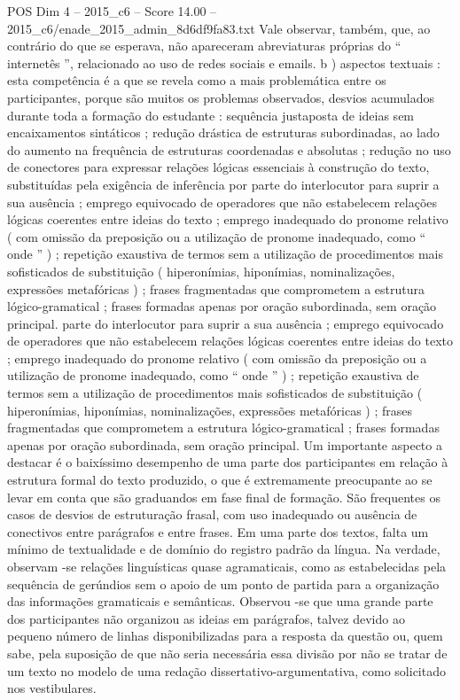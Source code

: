 \begin{textsample}{POS Dim 4 – 2015\_c6 – Score 14.00 – 2015\_c6/enade\_2015\_admin\_8d6df9fa83.txt}
Vale observar, também, que, ao contrário do que se esperava, não apareceram abreviaturas próprias do “ internetês ”, relacionado ao uso de redes sociais e emails. b ) aspectos textuais : esta competência é a que se revela como a mais problemática entre os participantes, porque são muitos os problemas observados, desvios acumulados durante toda a formação do estudante : sequência justaposta de ideias sem encaixamentos sintáticos ; redução drástica de estruturas subordinadas, ao lado do aumento na frequência de estruturas coordenadas e absolutas ; redução no uso de conectores para expressar relações lógicas essenciais à construção do texto, substituídas pela exigência de inferência por parte do interlocutor para suprir a sua ausência ; emprego equivocado de operadores que não estabelecem relações lógicas coerentes entre ideias do texto ; emprego inadequado do pronome relativo ( com omissão da preposição ou a utilização de pronome inadequado, como “ onde ” ) ; repetição exaustiva de termos sem a utilização de procedimentos mais sofisticados de substituição ( hiperonímias, hiponímias, nominalizações, expressões metafóricas ) ; frases fragmentadas que comprometem a estrutura lógico-gramatical ; frases formadas apenas por oração subordinada, sem oração principal. parte do interlocutor para suprir a sua ausência ; emprego equivocado de operadores que não estabelecem relações lógicas coerentes entre ideias do texto ; emprego inadequado do pronome relativo ( com omissão da preposição ou a utilização de pronome inadequado, como “ onde ” ) ; repetição exaustiva de termos sem a utilização de procedimentos mais sofisticados de substituição ( hiperonímias, hiponímias, nominalizações, expressões metafóricas ) ; frases fragmentadas que comprometem a estrutura lógico-gramatical ; frases formadas apenas por oração subordinada, sem oração principal.
Um importante aspecto a destacar é o baixíssimo desempenho de uma parte dos participantes em relação à estrutura formal do texto produzido, o que é extremamente preocupante ao se levar em conta que são graduandos em fase final de formação.
São frequentes os casos de desvios de estruturação frasal, com uso inadequado ou ausência de conectivos entre parágrafos e entre frases.
Em uma parte dos textos, falta um mínimo de textualidade e de domínio do registro padrão da língua.
Na verdade, observam -se relações linguísticas quase agramaticais, como as estabelecidas pela sequência de gerúndios sem o apoio de um ponto de partida para a organização das informações gramaticais e semânticas.
Observou -se que uma grande parte dos participantes não organizou as ideias em parágrafos, talvez devido ao pequeno número de linhas disponibilizadas para a resposta da questão ou, quem sabe, pela suposição de que não seria necessária essa divisão por não se tratar de um texto no modelo de uma redação dissertativo-argumentativa, como solicitado nos vestibulares.

\end{textsample}
